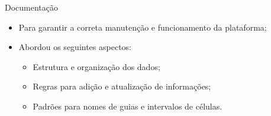 \begin{frame}{Documentação}
    \begin{itemize}
        \item Para garantir a correta manutenção e funcionamento da plataforma; \vspace{0.5cm}
        \item Abordou os seguintes aspectos: \vspace{0.5cm}
              \begin{itemize}
                  \item Estrutura e organização dos dados; \vspace{0.5cm}
                  \item Regras para adição e atualização de informações; \vspace{0.5cm}
                  \item Padrões para nomes de guias e intervalos de células.
              \end{itemize}
    \end{itemize}
\end{frame}